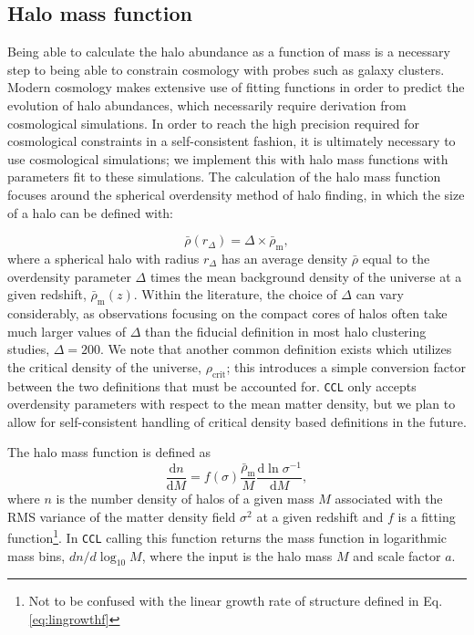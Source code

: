 \documentclass[\docopts]{\docclass}
\newcommand{\ccl}{{\tt CCL}\xspace}
\begin{document}
\subsection{Halo mass function}

Being able to calculate the halo abundance as a function of mass is a necessary step to being able to constrain cosmology with probes such as galaxy clusters. Modern cosmology makes extensive use of fitting functions in order to predict the evolution of halo abundances, which necessarily require derivation from cosmological simulations. In order to reach the high precision required for cosmological constraints in a self-consistent fashion, it is ultimately necessary to use cosmological simulations; we implement this with halo mass functions with parameters fit to these simulations. The calculation of the halo mass function focuses around the spherical overdensity method of halo finding, in which the size of a halo can be defined with:

\begin{equation}
\bar{\rho}(r_{\Delta}) = \Delta \times \bar{\rho}_{\mathrm{m}},
\end{equation}
%
where a spherical halo with radius $r_{\Delta}$ has an average density $\bar{\rho}$ equal to the overdensity parameter $\Delta$ times the mean background density of the universe at a given redshift, $\bar\rho_{\mathrm{m}}(z)$. Within the literature, the choice of $\Delta$ can vary considerably, as observations focusing on the compact cores of halos often take much larger values of $\Delta$ than the fiducial definition in most halo clustering studies, $\Delta = 200$. We note that another common definition exists which utilizes the critical density of the universe, $\rho_{\mathrm{crit}}$; this introduces a simple conversion factor between the two definitions that must be accounted for. \ccl only accepts overdensity parameters with respect to the mean matter density, but we plan to allow for self-consistent handling of critical density based definitions in the future.

The halo mass function is defined as
\begin{equation}
\frac{\mathrm{d}n}{\mathrm{d}M}=f(\sigma)\frac{\bar{\rho}_\mathrm{m}}{M}\frac{\mathrm{d}\ln{\sigma^{-1}}}{\mathrm{d}M},
\label{eq:halo_mass_function}
\end{equation}
where $n$ is the number density of halos of a given mass $M$ associated with the RMS variance of the matter density field $\sigma^2$ at a given redshift and $f$ is a fitting function\footnote{Not to be confused with the linear growth rate of structure defined in Eq. \ref{eq:lingrowthf}}. In \ccl calling this function returns the mass function in logarithmic mass bins, $dn/d\log_{10}{M}$, where the input is the halo mass $M$ and scale factor $a$.
\end{document}
